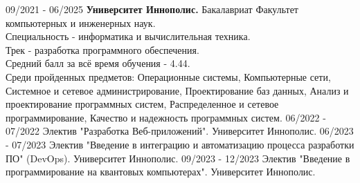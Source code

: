 \documentclass[9pt]{developercv} %
\begin{document}
\vspace{-10 pt}
\begin{entrylist}
    \entry
		{09/2021 - 06/2025}
		{{\textbf{Университет Иннополис.}}}
		{Бакалавриат}
		{Факультет компьютерных и инженерных наук. \\
            Специальность - информатика и вычислительная техника. \\
            Трек - разработка программного обеспечения. \\
            Средний балл за всё время обучения - 4.44. \\
            Среди пройденных предметов: Операционные системы, Компьютерные сети, Системное и сетевое администрирование, Проектирование баз данных, Анализ и проектирование программных систем, Распределенное и сетевое программирование, Качество и надежность программных систем.}
    \entry
		{06/2022 - 07/2022}
		{Электив "Разработка Веб-приложений". {Университет Иннополис.}}
            {}
		{}
    \entry
		{06/2023 - 07/2023}
		{Электив "Введение в интеграцию и автоматизацию процесса разработки ПО" (DevOps). {Университет Иннополис.}}
		  {}
		{}
    \entry
		{09/2023 - 12/2023}
		{Электив "Введение в программирование на квантовых компьютерах". {Университет Иннополис.}}
            {}
		{}
		 
\end{entrylist}
\end{document}

